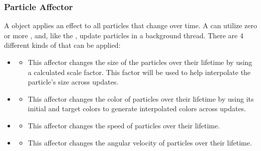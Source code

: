 \subsubsection{Particle Affector}

A  object applies an effect to all particles that change over time. A  can utilize zero or more , and, like the ,  update particles in a background thread. There are 4 different kinds of  that can be applied:

\begin{itemize}[nolistsep,topsep=10pt]

	\item {}
	\begin{itemize}[nolistsep,topsep=0pt]
		\item This affector changes the size of the particles over their lifetime by using a calculated scale factor. This factor will be used to help interpolate the particle's size across updates.
	\end{itemize}

	\item {}
	\begin{itemize}[nolistsep,topsep=0pt]
		\item This affector changes the color of particles over their lifetime by using its initial and target colors to generate interpolated colors across updates.
	\end{itemize}

	\item {}
	\begin{itemize}[nolistsep,topsep=0pt]
		\item This affector changes the speed of particles over their lifetime.
	\end{itemize}

	\item {}
	\begin{itemize}[nolistsep,topsep=0pt]
		\item This affector changes the angular velocity of particles over their lifetime.
	\end{itemize}

\end{itemize}

